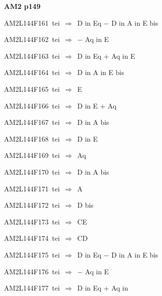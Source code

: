 \par\vfill\eject
{\bf\hfill AM2 p149\hfill\hbox{}}\par\bigskip
{\sixrm AM2L144F161\ {\sixit tei}\ }$\Rightarrow$\ {\tenit D}
{\tenit in} {\tenit Eq} − {\tenit D} {\tenit in} {\tenit A} {\tenit in} {\tenit E}
{\tenit bis}\par\smallskip
{\sixrm AM2L144F162\ {\sixit tei}\ }$\Rightarrow$\ − {\tenit Aq}
{\tenit in} {\tenit E}\par\smallskip
{\sixrm AM2L144F163\ {\sixit tei}\ }$\Rightarrow$\ {\tenit D} {\tenit in} {\tenit Eq} + {\tenit Aq} {\tenit in}
{\tenit E}\par\smallskip
{\sixrm AM2L144F164\ {\sixit tei}\ }$\Rightarrow$\ {\tenit D} {\tenit in} {\tenit A}
{\tenit in} {\tenit E} {\tenit bis}\par\smallskip
{\sixrm AM2L144F165\ {\sixit tei}\ }$\Rightarrow$\ {\tenit E}\par\smallskip
{\sixrm AM2L144F166\ {\sixit tei}\ }$\Rightarrow$\ {\tenit D} {\tenit in} {\tenit E} +
{\tenit Aq}\par\smallskip
{\sixrm AM2L144F167\ {\sixit tei}\ }$\Rightarrow$\ {\tenit D} {\tenit in}
{\tenit A} {\tenit bis}\par\smallskip
{\sixrm AM2L144F168\ {\sixit tei}\ }$\Rightarrow$\ {\tenit D} {\tenit in}
{\tenit E}\par\smallskip
{\sixrm AM2L144F169\ {\sixit tei}\ }$\Rightarrow$\ {\tenit Aq}\par\smallskip
{\sixrm AM2L144F170\ {\sixit tei}\ }$\Rightarrow$\ {\tenit D} {\tenit in} {\tenit A} {\tenit bis}\par\smallskip
{\sixrm AM2L144F171\ {\sixit tei}\ }$\Rightarrow$\ {\tenit A}\par\smallskip
{\sixrm AM2L144F172\ {\sixit tei}\ }$\Rightarrow$\ {\tenit D} {\tenit bis}\par\smallskip
{\sixrm AM2L144F173\ {\sixit tei}\ }$\Rightarrow$\ CE\par\smallskip
{\sixrm AM2L144F174\ {\sixit tei}\ }$\Rightarrow$\ CD\par\smallskip
{\sixrm AM2L144F175\ {\sixit tei}\ }$\Rightarrow$\ {\tenit D} {\tenit in}
{\tenit Eq} − {\tenit D} {\tenit in} {\tenit A} {\tenit in} {\tenit E}
{\tenit bis}\par\smallskip
{\sixrm AM2L144F176\ {\sixit tei}\ }$\Rightarrow$\ − {\tenit Aq}
{\tenit in} {\tenit E}\par\smallskip
{\sixrm AM2L144F177\ {\sixit tei}\ }$\Rightarrow$\ {\tenit D} {\tenit in} {\tenit Eq} + {\tenit Aq} {\tenit in}
